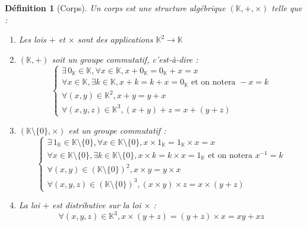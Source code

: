 \documentclass[a4paper,12pt,french,draft]{report}
\newtheorem{definition}{Définition}[section]
\begin{document}
			\begin{definition}[Corps] 
				Un corps est une structure algébrique \( (\mathbb{K} , + , \times ) \) telle que :
				\begin{enumerate}
					\item Les lois \( + \) et \( \times \) sont des applications \( \mathbb{K}^2 \longrightarrow \mathbb{K} \)
					\item \((\mathbb{K} , +)\) soit un groupe commutatif, c'est-à-dire :
						\[ 
							\left\{ 
							\begin{array}{lll}
								\exists \, 0_{\mathbb{K}} \in \mathbb{K} , \forall x \in \mathbb{K}, x + 0_{\mathbb{K}} = 0_{\mathbb{K}} + x = x
								\\
								\forall x \in \mathbb{K} , \exists k \in \mathbb{K} , x + k = k + x = 0_{\mathbb{K}} \mbox{  et on notera } -x = k
								\\
								\forall (x,y) \in \mathbb{K}^{2},
											x + y = y + x
										
								\\
								\forall (x, y, z) \in \mathbb{K}^3, (x + y) + z = x + (y + z)
									 
							\end{array}
							\right.
						\]
					\item \((\mathbb{K}\setminus\{0\}, \times) \) est un groupe commutatif :
						\[ 
								\left\{ 
								\begin{array}{lll}
									\exists \, 1_{\mathbb{K}} \in \mathbb{K}\setminus\{0\} , \forall x \in \mathbb{K}\setminus\{0\}, x \times 1_{\mathbb{K}} = 1_{\mathbb{K}} \times x = x
									\\
									\forall x \in \mathbb{K}\setminus\{0\} , \exists k \in \mathbb{K}\setminus\{0\} , x \times k = k \times x = 1_{\mathbb{K}} \mbox{  et on notera } x^{-1} = k
									\\
									\forall (x,y) \in (\mathbb{K}\setminus\{0\})^{2},
												x \times y = y \times x
									\\
									\forall (x, y, z) \in (\mathbb{K}\setminus\{0\})^3, (x \times y) \times z = x \times (y + z)
										 
								\end{array}
								\right.
							\]
					\item La loi \( + \) est distributive sur la loi \( \times \) :
						\[
						\forall (x, y, z) \in \mathbb{K}^3, x \times (y + z) = (y + z) \times x = xy + xz
						\]
				\end{enumerate}
			
			\end{definition}
			
\end{document}
